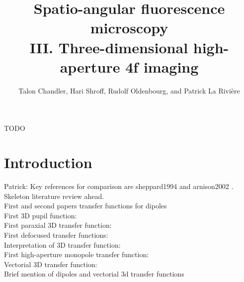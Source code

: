 \documentclass[]{osa-article}
\providecommand{\add}[1]{{\color{blue}#1}}
\begin{document}
\title{Spatio-angular fluorescence microscopy\\ III. Three-dimensional high-aperture 4f imaging}

\author{Talon Chandler, Hari Shroff, Rudolf Oldenbourg, and Patrick La Rivi\`ere}

\address{University of Chicago, Department of Radiology, Chicago, Illinois 60637, USA\\
  Section on High Resolution Optical Imaging, National Institute of Biomedical Imaging and Bioengineering, National Institutes of Health, Bethesda, Maryland 20892, USA\\
  Marine Biological Laboratory, Bell Center, Woods Hole, Massachusetts 02543, USA}


\begin{abstract*}
  TODO
\end{abstract*}

\section{Introduction}
\add{Patrick: Key references for comparison are sheppard1994} \cite{sheppard1994} \add{and arnison2002} \cite{arnison2002}.\\

\noindent Skeleton literature review ahead. \\

\noindent First and second papers transfer functions for dipoles \cite{chandler2019a, chandler2019b}\\

\noindent First 3D pupil function: \cite{mccutchen1964}\\
First paraxial 3D transfer function: \cite{frieden1967}\\
First defocused transfer functions: \cite{stokseth1969}\\
Interpretation of 3D transfer function: \cite{sheppard1989}\\
First high-aperture monopole transfer function: \cite{sheppard1994}\\
Vectorial 3D transfer function: \cite{sheppard1997a, philip1999, arnison2002, schonle2002}\\
Brief mention of dipoles and vectorial 3d transfer functions \cite{sheppard1997b, schonle2002}\\
\end{document}
